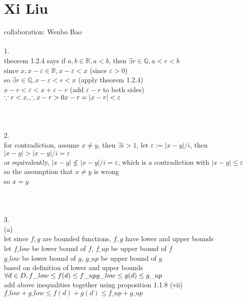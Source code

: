 \documentclass[12pt, border = 4pt, multi]{article} %
\begin{document}
\section*{Xi Liu}
collaboration: Wenbo Bao\\
\\
1.\\
theorem 1.2.4 says if $a, b \in \mathbb{R}, a < b$, then $\exists r \in \mathbb{Q}, a < r < b$\\
since $x, x - \varepsilon \in \mathbb{R}, x - \varepsilon < x$ \qquad (since $\varepsilon > 0$)\\
so $\exists r \in \mathbb{Q}, x - \varepsilon < r < x$ \qquad (apply theorem 1.2.4)\\
$x - r < \varepsilon < x + \varepsilon - r$ \qquad (add $\varepsilon - r$ to both sides)\\
$\because r < x, \therefore x - r > 0\\
x - r = |x - r| < \varepsilon$\\
\\
\\
\\
2.\\
for contradiction, assume $x \not= y$, then $\exists i > 1$, let $\varepsilon := |x - y| / i$, then $|x - y| > |x - y| / i = \varepsilon$\\
or equivalently, $|x - y| \not\leq |x - y| / i = \varepsilon$, which is a contradiction with $|x - y| \leq \varepsilon$\\
so the assumption that $x \not= y$ is wrong\\
so $x = y$\\
\\
\\
\\
3.\\
(a)\\
let since $f, g$ are bounded functions, $f, g$ have lower and upper bounds\\
let $f\_low$ be lower bound of $f$, $f\_up$ be upper bound of $f$\\
$g\_low$ be lower bound of $g$, $g\_up$ be upper bound of $g$\\
based on definition of lower and upper bounds\\
$\forall d \in D, f\_low \leq f(d) \leq f\_up\\
g\_low \leq g(d) \leq g\_up$\\
add above inequalities together using proposition 1.1.8 (vii)\\ 
$f\_low + g\_low \leq f(d) + g(d) \leq f\_up + g\_up$\\
\end{document}
